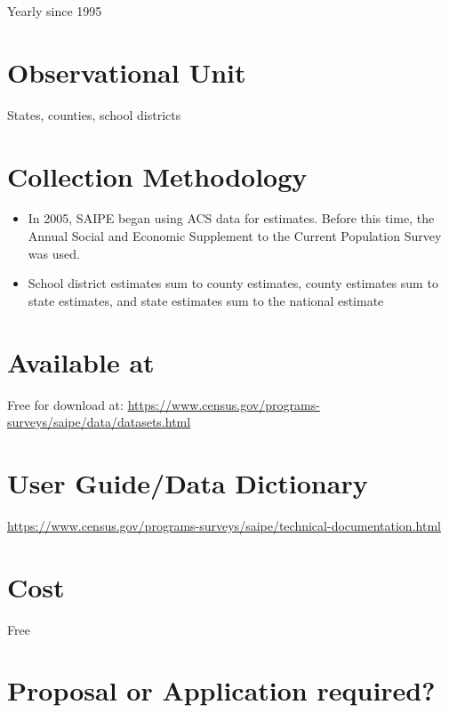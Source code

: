 \documentclass[
]{book}
\providecommand{\tightlist}{%
  \setlength{\itemsep}{0pt}\setlength{\parskip}{0pt}}
\begin{document}
Yearly since 1995

\hypertarget{observational-unit-79}{%
\section{Observational Unit}\label{observational-unit-79}}

States, counties, school districts

\hypertarget{collection-methodology-79}{%
\section{Collection Methodology}\label{collection-methodology-79}}

\begin{itemize}
\tightlist
\item
  In 2005, SAIPE began using ACS data for estimates. Before this time, the Annual Social and Economic Supplement to the Current Population Survey was used.
\item
  School district estimates sum to county estimates, county estimates sum to state estimates, and state estimates sum to the national estimate
\end{itemize}

\hypertarget{available-at-79}{%
\section{Available at}\label{available-at-79}}

Free for download at: \url{https://www.census.gov/programs-surveys/saipe/data/datasets.html}

\hypertarget{user-guidedata-dictionary-79}{%
\section{User Guide/Data Dictionary}\label{user-guidedata-dictionary-79}}

\url{https://www.census.gov/programs-surveys/saipe/technical-documentation.html}

\hypertarget{cost-79}{%
\section{Cost}\label{cost-79}}

Free

\hypertarget{proposal-or-application-required-79}{%
\section{Proposal or Application required?}\label{proposal-or-application-required-79}}
\end{document}
